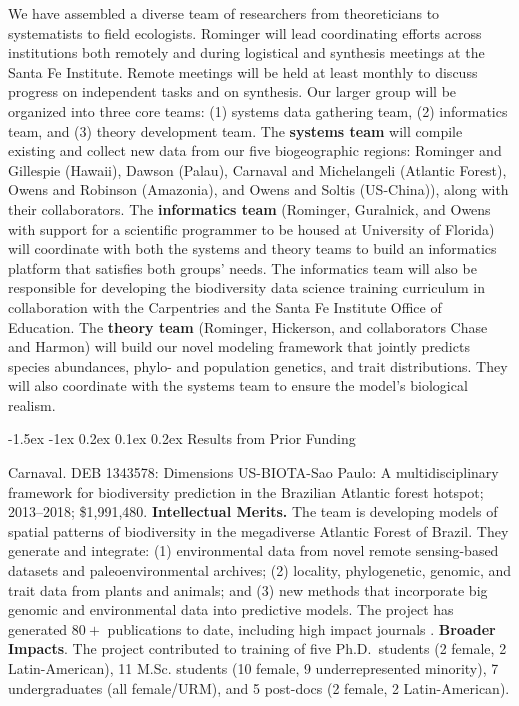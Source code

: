 \documentclass[11pt]{article}
\makeatletter
\renewcommand\section{\@startsection{section}{1}{\z@}%
                                  {-1.5ex \@plus -1ex \@minus 0.2ex}%
                                  {0.1ex \@plus 0.2ex}%
                                  {\normalfont\Large\bfseries}}
\renewcommand{\paragraph}{\@startsection{paragraph}{4}{\z@}
  {1.5ex \@plus 1ex \@minus .2ex}{-1em}
  {\normalfont\normalsize\it}
}
\makeatother
\begin{document}
We have assembled a diverse team of researchers from theoreticians to
systematists to field ecologists. Rominger will lead coordinating
efforts across institutions both remotely and during logistical and
synthesis meetings at the Santa Fe Institute. Remote meetings will be
held at least monthly to discuss progress on independent tasks and on
synthesis. Our larger group will be organized into three core teams:
(1) systems data gathering team, (2) informatics team, and (3) theory
development team. The \textbf{systems team} will compile existing and
collect new data from our five biogeographic regions: Rominger and
Gillespie (Hawaii), Dawson (Palau), Carnaval and Michelangeli
(Atlantic Forest), Owens and Robinson (Amazonia), and Owens and Soltis
(US-China)), along with their collaborators. The \textbf{informatics
  team} (Rominger, Guralnick, and Owens with support for a scientific
programmer to be housed at University of Florida) will coordinate with
both the systems and theory teams to build an informatics platform
that satisfies both groups' needs. The informatics team will also be
responsible for developing the biodiversity data science training
curriculum in collaboration with the Carpentries and the Santa Fe
Institute Office of Education. The \textbf{theory team} (Rominger,
Hickerson, and collaborators Chase and Harmon) will build our novel
modeling framework that jointly predicts species abundances, phylo-
and population genetics, and trait distributions. They will also
coordinate with the systems team to ensure the model's biological
realism.

\section{Results from Prior Funding} \label{results-from-prior-funding}

\paragraph{Carnaval.} DEB 1343578: Dimensions US-BIOTA-Sao Paulo: A
multidisciplinary framework for biodiversity prediction in the
Brazilian Atlantic forest hotspot; 2013--2018;
\$1,991,480. \textbf{Intellectual Merits.} The team is developing
models of spatial patterns of biodiversity in the megadiverse Atlantic
Forest of Brazil. They generate and integrate: (1) environmental data
from novel remote sensing-based datasets and paleoenvironmental
archives; (2) locality, phylogenetic, genomic, and trait data from
plants and animals; and (3) new methods that incorporate big genomic
and environmental data into predictive models. The project has
generated $80+$ publications to date, including high impact journals
\cite{Do_Amaral2016-bi, Prates2016-at, Prates2016-gr, Maestri2016-bp,
  Zamborlini_Saiter2016-zu, Montade2016-wl, Bernal2016-pd,
  Bustamante2016-qt, Gu2017-oz}.  \textbf{Broader Impacts}. The
project contributed to training of five Ph.D.~students (2 female, 2
Latin-American), 11 M.Sc. students (10 female, 9 underrepresented
minority), 7 undergraduates (all female/URM), and 5 post-docs (2
female, 2 Latin-American).
\end{document}

